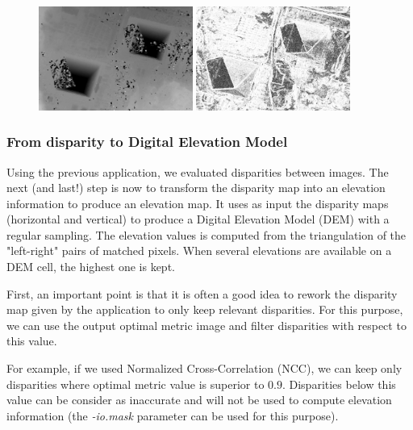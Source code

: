 \begin{figure}[!h]
  \center
  \includegraphics[width=0.45\textwidth]{../Art/MonteverdiImages/stereo_disparity_horizontal.png}
  \includegraphics[width=0.45\textwidth]{../Art/MonteverdiImages/stereo_disparity_metric.png}
  \label{fig:EpipolarImages}
\end{figure}

\subsubsection{From disparity to Digital Elevation Model}

Using the previous application, we evaluated disparities between images. The
next (and last!) step is now to transform the disparity map into an elevation
information to produce an elevation map. It uses as input the disparity maps
(horizontal and vertical) to produce a Digital Elevation Model (DEM) with a
regular sampling. The elevation values is computed from the triangulation of the
"left-right" pairs of matched pixels. When several elevations are available on
a DEM cell, the highest one is kept.

First, an important point is that it is often a good idea to rework
the disparity map given by the  application
to only keep relevant disparities. For this purpose, we can use the
output optimal metric image and filter disparities with respect to this
value.

For example, if we used Normalized Cross-Correlation (NCC), we can
keep only disparities where optimal metric value is superior to
$0.9$. Disparities below this value can be consider as inaccurate and
will not be used to compute elevation information
(the \textit{-io.mask} parameter can be used for this purpose).

